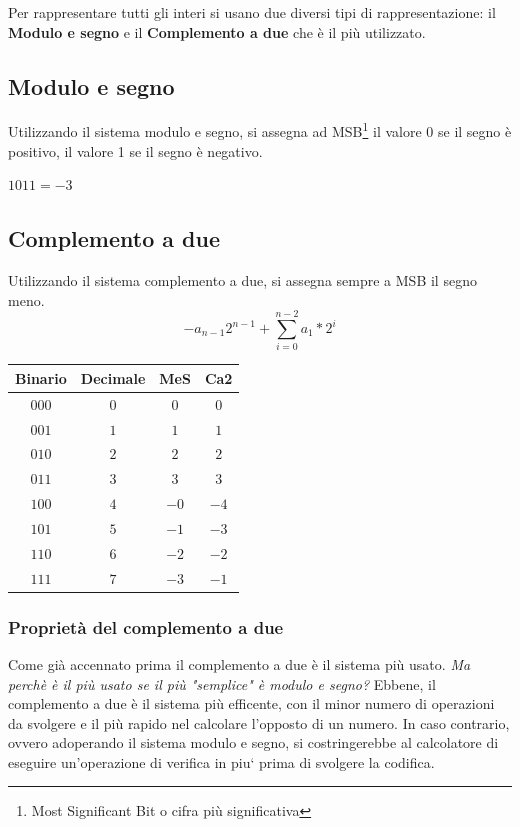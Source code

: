 Per rappresentare tutti gli interi si usano due diversi tipi di rappresentazione: il \textbf{Modulo e segno} e il \textbf{Complemento a due} che è il più utilizzato.

\subsection{Modulo e segno}
Utilizzando il sistema modulo e segno, si assegna ad MSB\footnote{Most Significant Bit o cifra più significativa} il valore 0 se il segno è positivo, il valore 1 se il segno è negativo.
\begin{center}$1011 = -3$\end{center}

\subsection{Complemento a due}
Utilizzando il sistema complemento a due, si assegna sempre a MSB il segno meno.
\begin{equation}-a_{n-1}2^{n-1}+\sum_{i=0}^{n-2}a_1*2^i\end{equation}
\begin{center}
    \begin{tabular}{c|c c c}
        \centering
        Binario & Decimale & MeS & Ca2\\\hline
        $000$ & $0$ & $0$ & $0$\\\hline
        $001$ & $1$ & $1$ & $1$\\\hline
        $010$ & $2$ & $2$ & $2$\\\hline
        $011$ & $3$ & $3$ & $3$\\\hline
        $100$ & $4$ & $-0$ & $-4$\\\hline
        $101$ & $5$ & $-1$ & $-3$\\\hline
        $110$ & $6$ & $-2$ & $-2$\\\hline
        $111$ & $7$ & $-3$ & $-1$
    \end{tabular}
\end{center}

\subsubsection*{Proprietà del complemento a due}
Come già accennato prima il complemento a due è il sistema più usato. \textit{Ma perchè è il più usato se il più "semplice" è modulo e segno?} Ebbene, il complemento a due è il sistema più efficente, con il minor numero di operazioni da svolgere e il più rapido nel calcolare l'opposto di un numero.
In caso contrario, ovvero adoperando il sistema modulo e segno, si costringerebbe al calcolatore di eseguire un’operazione di verifica in piu` prima di svolgere la codifica.
